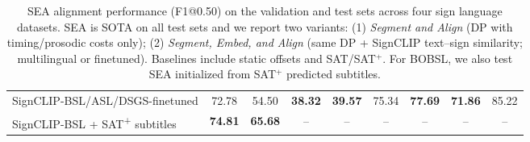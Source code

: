 \documentclass[11pt]{article}
\begin{document}
\begin{table}
{\begin{tabular}{l cc cc cc cc}
SignCLIP-BSL/ASL/DSGS-finetuned & 72.78 & 54.50 & \textbf{38.32} & \textbf{39.57} & 75.34 & \textbf{77.69} & \textbf{71.86} & 85.22  \\
SignCLIP-BSL + SAT\textsuperscript{+} subtitles & \textbf{74.81} & \textbf{65.68} & -- & -- & -- & -- & -- & --  \\
      \bottomrule
    \end{tabular}%
    }
    \caption{SEA alignment performance (F1@0.50) on the validation and test sets across four sign language datasets. SEA is SOTA on all test sets and we report two variants: (1) \emph{Segment and Align} (DP with timing/prosodic costs only); (2) \emph{Segment, Embed, and Align} (same DP + SignCLIP text–sign similarity; multilingual or finetuned). Baselines include static offsets and SAT/SAT$^{+}$. For BOBSL, we also test SEA initialized from SAT$^{+}$ predicted subtitles.}
    \label{tab:results}
\end{table}
\end{document}

